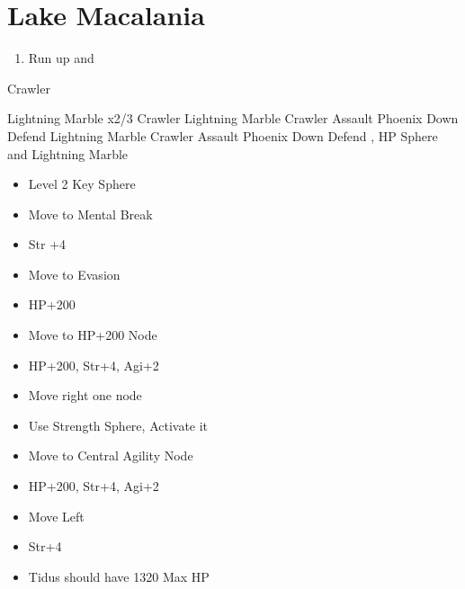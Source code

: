 \chapter{Lake Macalania}

\begin{enumerate}
	\item Run up and \sd
\end{enumerate}
\begin{battle}[1600]{Crawler}
\begin{itemize}
	\switch{\tidus}{\rikku}
	\rikkuf Lightning Marble x2/3 Crawler
	\kimahrif Lightning Marble Crawler
	\enemyf Assault \rikku
	\luluf Phoenix Down \rikku
	\switch{\kimahri}{\yuna}
	\yunaf Defend
	\rikkuf Lightning Marble Crawler
	\enemyf Assault \rikku
	\luluf Phoenix Down \rikku
	\switch{\yuna}{\tidus}
	\tidusf Defend
	\rikkuf \od, HP Sphere and Lightning Marble
\end{itemize}
\end{battle}
\begin{spheregrid}
\begin{itemize}
	\tidusf
	\begin{itemize}
		\item Level 2 Key Sphere
		\item Move to Mental Break
		\item Str +4
		\item Move to Evasion
		\item HP+200
		\item Move to HP+200 Node
		\item HP+200, Str+4, Agi+2
		\item Move right one node
		\item Use Strength Sphere, Activate it
		\item Move to Central Agility Node
		\item HP+200, Str+4, Agi+2
		\item Move Left
		\item Str+4
		\item Tidus should have 1320 Max HP
	\end{itemize}
\end{itemize}
\end{spheregrid}
